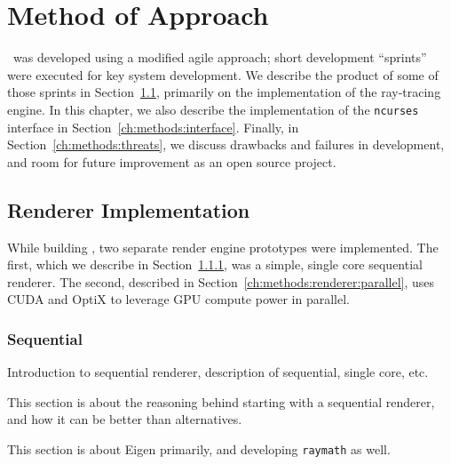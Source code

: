 %
%
%
\chapter{Method of Approach} \label{ch:methods}

\name\ was developed using a modified agile approach; short development ``sprints'' were executed for key system development.
We describe the product of some of those sprints in Section~\ref{ch:methods:renderer}, primarily on the implementation of the ray-tracing engine.
In this chapter, we also describe the implementation of the \texttt{ncurses} interface in Section~\ref{ch:methods:interface}.
Finally, in Section~\ref{ch:methods:threats}, we discuss drawbacks and failures in development, and room for future improvement as an open source project.


\section{Renderer Implementation} \label{ch:methods:renderer}
While building \name, two separate render engine prototypes were implemented.
The first, which we describe in Section~\ref{ch:methods:renderer:sequential}, was a simple, single core sequential renderer.
The second, described in Section~\ref{ch:methods:renderer:parallel}, uses CUDA \cite{nvidia2011cuda} and OptiX \cite{parker2010optix} to leverage GPU compute power in parallel.


\subsection{Sequential} \label{ch:methods:renderer:sequential}

Introduction to sequential renderer, description of sequential, single core, etc.

 \label{ch:methods:renderer:sequential:motivation}

This section is about the reasoning behind starting with a sequential renderer, and how it can be better than alternatives.

 \label{ch:methods:renderer:sequential:libraries}

This section is about Eigen primarily, and developing \texttt{raymath} as well.

